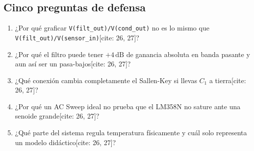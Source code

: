 \documentclass[10pt, a4paper]{article}
\begin{document}
\subsection*{Cinco preguntas de defensa}
\begin{enumerate}[noitemsep, leftmargin=*]
    \item ¿Por qué graficar \texttt{V(filt\_out)/V(cond\_out)} no es lo mismo que \texttt{V(filt\_out)/V(sensor\_in)}[cite: 26, 27]?
    \item ¿Por qué el filtro puede tener $+4\,\text{dB}$ de ganancia absoluta en banda pasante y aun así ser un pasa-bajos[cite: 26, 27]?
    \item ¿Qué conexión cambia completamente el Sallen-Key si llevas $C_1$ a tierra[cite: 26, 27]?
    \item ¿Por qué un AC Sweep ideal no prueba que el LM358N no sature ante una senoide grande[cite: 26, 27]?
    \item ¿Qué parte del sistema regula temperatura físicamente y cuál solo representa un modelo didáctico[cite: 26, 27]?
\end{enumerate}
\end{document}

